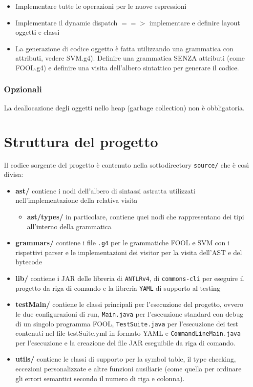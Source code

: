 \documentclass[a4paper]{article}   %
\begin{document}
\begin{itemize}
  \item Implementare tutte le operazioni per le nuove espressioni
  \item Implementare il dynamic dispatch $==>$ implementare e definire layout oggetti e classi
  \item La generazione di codice oggetto è fatta utilizzando una grammatica con attributi,
vedere SVM.g4).
Definire una grammatica SENZA attributi (come FOOL.g4) e definire una visita
dell'albero sintattico per generare il codice.
\end{itemize}

\subsubsection{Opzionali}

La deallocazione degli oggetti nello heap (garbage collection) non è obbligatoria.

\section{Struttura del progetto}

Il codice sorgente del progetto è contenuto nella sottodirectory \lstinline|source/| che è così divisa:

\begin{itemize}
  \item \textbf{ast/} contiene i nodi dell'albero di sintassi astratta utilizzati nell'implementazione della relativa visita
  \begin{itemize}
    \item \textbf{ast/types/}
    in particolare, contiene quei nodi che rappresentano dei tipi all'interno della grammatica
  \end{itemize}
  \item \textbf{grammars/}
    contiene i file \lstinline|.g4| per le grammatiche FOOL e SVM con i rispettivi parser e le implementazioni dei visitor per la visita dell'AST e del bytecode
  \item \textbf{lib/}
    contiene i JAR delle libreria di \lstinline|ANTLRv4|, di \lstinline|commons-cli| per eseguire il progetto da riga di comando
    e la libreria \lstinline|YAML| di supporto al testing
  \item \textbf{testMain/}
    contiene le classi principali per l'esecuzione del progetto, ovvero le
    due configurazioni di run, \lstinline|Main.java| per l'esecuzione standard con debug di un singolo programma FOOL, \lstinline|TestSuite.java| per l'esecuzione dei test contenuti nel file testSuite.yml in formato YAML e \lstinline|CommandLineMain.java| per l'esecuzione e la creazione del file JAR eseguibile da riga di comando.
  \item \textbf{utils/}
    contiene le classi di supporto per la symbol table, il type checking, eccezioni personalizzate e altre funzioni ausiliarie (come quella per ordinare gli errori semantici secondo il numero di riga e colonna).

\end{itemize}
\end{document}
